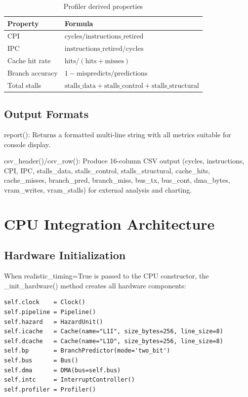 \documentclass[12pt,a4paper,twoside]{book}
\theoremstyle{trinarytheorem}
\theoremstyle{trinarydefinition}
\newcommand{\code}[1]{\textsf{#1}}
\begin{document}
\begin{table}[H]
\centering
\caption{Profiler derived properties}
\label{tab:profilermetrics}
\begin{tabular}{ll}
\toprule
Property & Formula \\
\midrule
CPI & $\text{cycles} / \text{instructions\_retired}$ \\
IPC & $\text{instructions\_retired} / \text{cycles}$ \\
Cache hit rate & $\text{hits} / (\text{hits} + \text{misses})$ \\
Branch accuracy & $1 - \text{mispredicts} / \text{predictions}$ \\
Total stalls & $\text{stalls\_data} + \text{stalls\_control} + \text{stalls\_structural}$ \\
\bottomrule
\end{tabular}
\end{table}

\subsection{Output Formats}

\noindent\code{report()}: Returns a formatted multi-line string with all
metrics suitable for console display.

\noindent\code{csv\_header()}/\code{csv\_row()}: Produce 16-column CSV
output (cycles, instructions, CPI, IPC, stalls\_data, stalls\_control,
stalls\_structural, cache\_hits, cache\_misses, branch\_pred,
branch\_miss, bus\_tx, bus\_cont, dma\_bytes, vram\_writes,
vram\_stalls) for external analysis and charting.

\section{CPU Integration Architecture}

\subsection{Hardware Initialization}

When \code{realistic\_timing=True} is passed to the CPU constructor, the
\code{\_init\_hardware()} method creates all hardware components:

\begin{verbatim}
self.clock    = Clock()
self.pipeline = Pipeline()
self.hazard   = HazardUnit()
self.icache   = Cache(name="L1I", size_bytes=256, line_size=8)
self.dcache   = Cache(name="L1D", size_bytes=256, line_size=8)
self.bp       = BranchPredictor(mode='two_bit')
self.bus      = Bus()
self.dma      = DMA(bus=self.bus)
self.intc     = InterruptController()
self.profiler = Profiler()
\end{verbatim}
\end{document}

